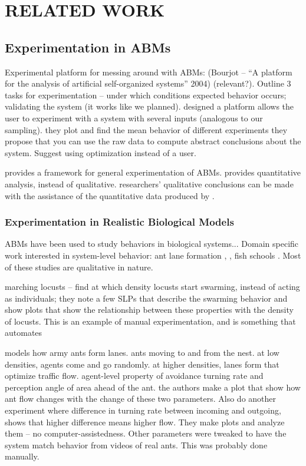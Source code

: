 \chapter{RELATED WORK}
\thispagestyle{plain}

\label{RelatedWork}


\section{Experimentation in ABMs}
\label{sec:abmexp}
Experimental platform for messing around with ABMs: (Bourjot -- ``A platform for the analysis of artificial self-organized systems'' 2004) (relevant?).
Outline 3 tasks for experimentation -- under which conditions expected behavior occurs; validating the system (it works like we planned).
designed a platform
allows the user to experiment with a system with several inputs (analogous to our sampling).
they plot and find the mean behavior of different experiments
they propose that you can use the raw data to compute abstract conclusions about the system.
Suggest using optimization instead of a user.

\fw provides a framework for general experimentation of ABMs.
provides quantitative analysis, instead of qualitative. researchers' qualitative conclusions can be made with the assistance of the quantitative data produced by \fw.

\subsection{Experimentation in Realistic Biological Models}
ABMs have been used to study behaviors in biological systems... Domain specific work interested in system-level behavior: ant lane formation , , fish schools . Most of these studies are qualitative in nature.

marching locusts \cite{buhl2006dom} -- find at which density locusts start swarming, instead of acting as individuals; they note a few SLPs that describe the swarming behavior and show plots that show the relationship between these properties with the density of locusts.
This is an example of manual experimentation, and is something that \fw automates

\cite{couzin2003sol}
models how army ants form lanes.
ants moving to and from the nest.
at low densities, agents come and go randomly.
at higher densities, lanes form that optimize traffic flow.
agent-level property of avoidance turning rate and perception angle of area ahead of the ant.
the authors make a plot that show how ant flow changes with the change of these two parameters.
Also do another experiment where difference in turning rate between incoming and outgoing, shows that higher difference means higher flow.
They make plots and analyze them -- no computer-assistedness.
Other parameters were tweaked to have the system match behavior from videos of real ants.
This was probably done manually.

